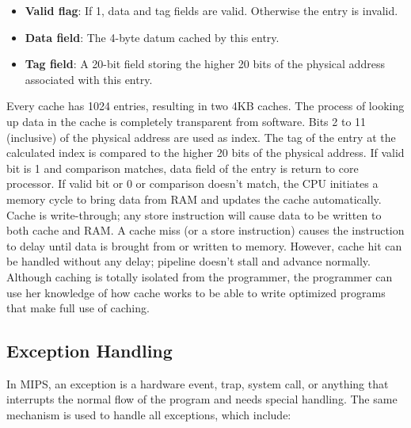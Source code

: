 \documentclass[oneside]{book}
\begin{document}
\begin{itemize}

\item \textbf{Valid flag}: If 1, data and tag fields are valid. Otherwise
      the entry is invalid.

\item \textbf{Data field}: The 4-byte datum cached by this entry.

\item \textbf{Tag field}: A 20-bit field storing the higher 20 bits
      of the physical address associated with this entry.

\end{itemize}

Every cache has 1024 entries, resulting in two 4KB caches. The process
of looking up data in the cache is completely transparent from software.
Bits 2 to 11 (inclusive) of the physical address are used as index.
The tag of the entry at the calculated index is compared to the
higher 20 bits of the physical address. If valid bit is 1 and
comparison matches, data field of the entry is return to core processor.
If valid bit or 0 or comparison doesn't match, the CPU initiates
a memory cycle to bring data from RAM and updates the cache automatically.\\

Cache is write-through; any store instruction will cause data to
be written to both cache and RAM. A cache miss (or a store instruction)
causes the instruction to delay until data is brought from or written to
memory. However, cache hit can be handled without any delay; pipeline doesn't
stall and advance normally. Although caching is totally isolated from the
programmer, the programmer can use her knowledge of how cache works to
be able to write optimized programs that make full use of caching.

\subsection{Exception Handling}

In MIPS, an exception is a hardware event, trap, system call, or anything
that interrupts the normal flow of the program and needs special handling.
The same mechanism is used to handle all exceptions, which include:
\end{document}
